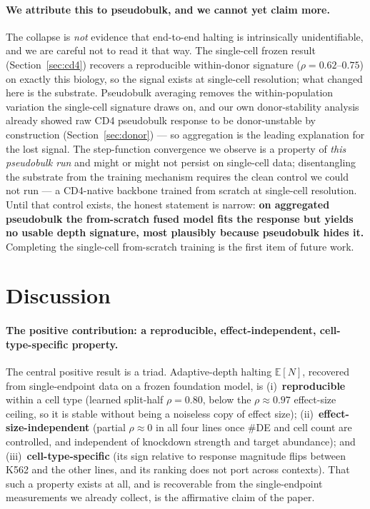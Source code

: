\documentclass[11pt]{article}
\newcommand{\EN}{\ensuremath{\mathbb{E}[N]}}
\let\mathrho\rho
\renewcommand{\rho}{\ensuremath{\mathrho}}
\begin{document}
\paragraph{We attribute this to pseudobulk, and we cannot yet claim more.} The collapse is
\emph{not} evidence that end-to-end halting is intrinsically unidentifiable, and we are careful not
to read it that way. The single-cell frozen result (Section~\ref{sec:cd4}) recovers a reproducible
within-donor signature (\rho{}$=0.62$--$0.75$) on exactly this biology, so the signal exists at
single-cell resolution; what changed here is the substrate. Pseudobulk averaging removes the
within-population variation the single-cell signature draws on, and our own donor-stability analysis
already showed raw CD4 pseudobulk response to be donor-unstable by construction
(Section~\ref{sec:donor}) --- so aggregation is the leading explanation for the lost signal. The
step-function convergence we observe is a property of \emph{this pseudobulk run} and might or might
not persist on single-cell data; disentangling the substrate from the training mechanism requires
the clean control we could not run --- a CD4-native backbone trained from scratch at single-cell
resolution. Until that control exists, the honest statement is narrow: \textbf{on aggregated
pseudobulk the from-scratch fused model fits the response but yields no usable depth signature,
most plausibly because pseudobulk hides it.} Completing the single-cell from-scratch training is the
first item of future work.


\section{Discussion}

\paragraph{The positive contribution: a reproducible, effect-independent, cell-type-specific
property.} The central positive result is a triad. Adaptive-depth halting \EN{}, recovered from
single-endpoint data on a frozen foundation model, is (i)~\textbf{reproducible} within a cell type
(learned split-half \rho{}$=0.80$, below the \rho{}$\approx0.97$ effect-size ceiling, so it is
stable without being a noiseless copy of effect size); (ii)~\textbf{effect-size-independent}
(partial \rho{}$\approx0$ in all four lines once \#DE and cell count are controlled, and
independent of knockdown strength and target abundance); and (iii)~\textbf{cell-type-specific}
(its sign relative to response magnitude flips between K562 and the other lines, and its ranking
does not port across contexts). That such a property exists at all, and is recoverable from the
single-endpoint measurements we already collect, is the affirmative claim of the paper.
\end{document}
